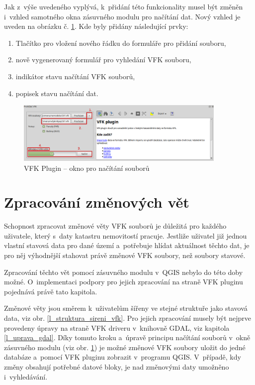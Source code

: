 \documentclass[a4paper,12pt,oneside]{book}
\begin{document}
Jak z~výše uvedeného vyplývá, k~přidání této funkcionality musel
být změněn i~vzhled samotného okna zásuvného modulu pro načítání
dat. Nový vzhled je uveden na obrázku
č. \ref{l_plugin_novy_vzhled}. Kde byly přidány následující prvky:

\begin{enumerate}
 \item Tlačítko pro vložení nového řádku do formuláře pro přidání souboru,
 \item nově vygenerovaný formulář pro vyhledání VFK souboru,
 \item indikátor stavu načítání VFK souborů,
 \item popisek stavu načítání dat.
\end{enumerate}

\begin{figure}[htb]
\centering
\includegraphics[width=0.9\textwidth]{images/vfkPlugin-novy_vzhled.png}
\caption[VFK Plugin -- okno pro načítání souborů]{VFK Plugin -- okno pro načítání souborů}
\label{l_plugin_novy_vzhled}
\end{figure}


\section{Zpracování změnových vět}
\label{l_zpracovani_zmen}
Schopnost zpracovat změnové věty VFK souborů je důležitá pro
každého uživatele, který s~daty katastru nemovitostí pracuje. Jestliže
uživatel již jednou vlastní stavová data pro dané území a~potřebuje
hlídat aktuálnost těchto dat, je pro něj výhodnější stahovat právě
změnové VFK soubory, než soubory stavové.

Zpracování těchto vět pomocí zásuvného modulu v~QGIS nebylo do této
doby možné. O~implementaci podpory pro jejich zpracování na straně VFK
pluginu pojednává právě tato kapitola.

Změnové věty jsou směrem k~uživatelům šířeny ve stejné struktuře jako
stavová data, viz obr. \ref{l_struktura_sireni_vfk}. Pro jejich
zpracování musely být nejprve provedeny úpravy na straně VFK driveru
v~knihovně GDAL, viz kapitola \ref{l_uprava_gdal}. Díky tomuto kroku
a~úpravě principu načítání souborů v~okně zásuvného modulu (viz
obr. \ref{l_plugin_novy_vzhled}) je možné změnové VFK soubory uložit
do jedné databáze a~pomocí VFK pluginu zobrazit v~programu
QGIS. V~případě, kdy změny obsahují potřebné datové bloky, je nad
změnovými daty umožněno i~vyhledávání.
\end{document}
